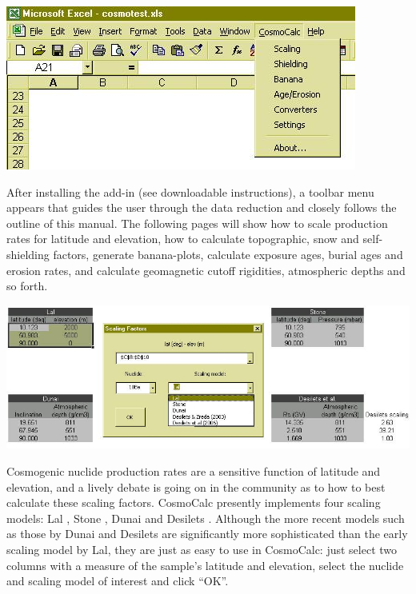 \documentclass[12pt]{article}
\begin{document}
\begin{minipage}[tbp]{\textwidth}
  \begin{center}
  \includegraphics[width=.6\textwidth]{menu.jpg}\\
  \end{center}
  After  installing  the  add-in  (see downloadable  instructions),  a
  toolbar menu appears that guides the user through the data reduction
  and closely follows the outline  of this manual. The following pages
  will show how to scale  production rates for latitude and elevation,
  how  to  calculate  topographic,  snow and  self-shielding  factors,
  generate  banana-plots,  calculate exposure  ages,  burial ages  and
  erosion   rates,  and   calculate  geomagnetic   cutoff  rigidities,
  atmospheric depths and so forth.
  \\
\end{minipage}

\begin{minipage}[tbp]{\textwidth}
\begin{center}
  \includegraphics[width=\textwidth]{scaling.jpg}\\
\end{center}
  Cosmogenic  nuclide production  rates  are a  sensitive function  of
  latitude  and elevation,  and a  lively debate  is going  on  in the
  community  as  to how  to  best  calculate  these scaling  factors.  
  CosmoCalc   presently   implements    four   scaling   models:   Lal
  \cite{lal1991},  Stone \cite{stone2000}, Dunai  \cite{dunai2000} and
  Desilets \cite{desilets2003}\cite{desilets2006}.  Although the more
  recent models such as those  by Dunai and Desilets are significantly
  more sophisticated  than the  early scaling model  by Lal,  they are
  just as  easy to use  in CosmoCalc: just  select two columns  with a
  measure of  the sample's latitude and elevation,  select the nuclide
  and scaling model of interest and click ``OK''.
  \\
\end{minipage}
\end{document}
